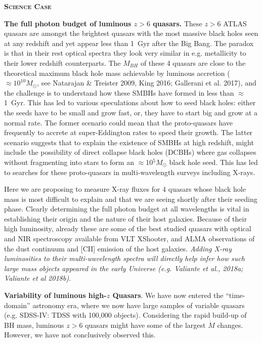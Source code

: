 \smallskip
\smallskip
\noindent
{\bfseries \textsc{Science Case}}

\smallskip
\smallskip
\noindent
{\bf The full photon budget of luminous $z>6$ quasars.} 
These $z>6$ ATLAS quasars are amongst the brightest quasars with the
most massive black holes seen at any redshift and yet appear less than
1~Gyr after the Big Bang.  The paradox is that in their rest optical
spectra they look very similar in e.g. metallicity to their lower
redshift counterparts. The $M_{BH}$ of these 4 quasars are close to
the theoretical maximum black hole mass achievable by luminous
accretion ($\approx10^{10}M_\odot$, see Natarajan \& Treister 2009,
King 2016; Gallerani et al. 2017), and the challenge is to understand
how these SMBHs have formed in less than $\approx$1~Gyr. This has led
to various speculations about how to seed black holes: either the
seeds have to be small and grow fast, or, they have to start big and
grow at a normal rate. The former scenario could mean that the
proto-quasars have frequently to accrete at super-Eddington rates to
speed their growth. The latter scenario suggests that to explain the
existence of SMBHs at high redshift, might include the possibility of
direct collapse black holes (DCBHs) where gas collapses without
fragmenting into stars to form an $\approx$10$^5 M_{\odot}$ black hole
seed. This has led to searches for these proto-quasars in
multi-wavelength surveys including X-rays.

\smallskip
\smallskip
\noindent
Here we are proposing to measure X-ray fluxes for 4 quasars whose
black hole mass is most difficult to explain and that we are seeing
shortly after their seeding phase. Clearly determining the full photon
budget at all wavelengths is vital in establishing their origin and
the nature of their host galaxies. Because of their high luminosity,
already these are some of the best studied quasars with optical and
NIR spectroscopy available from VLT XShooter, and ALMA observations of
the dust continuum and [CII] emission of the host galaxies. {\it Adding
X-ray luminosities to their multi-wavelength spectra will directly help infer
how such large mass objects appeared in the early Universe 
(e.g.  Valiante et al., 2018a; Valiante et al 2018b).} 





\smallskip
\smallskip
\noindent
{\bf Variability of luminous high-$z$ Quasars}. 
We have now entered the ``time-domain'' astronomy era, where we now
have large samples of variable quasars (e.g. SDSS-IV: TDSS with 100,000 objects).
Considering the rapid build-up of BH mass, luminous $z>6$ quasars
might have some of the largest $\dot{M}$ changes.  However, we have not
conclusively observed this.

